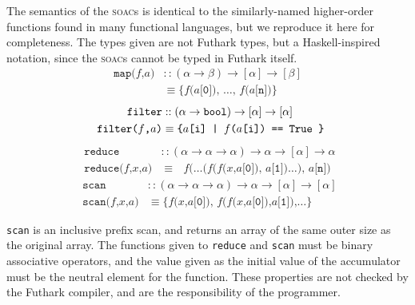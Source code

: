\documentclass[oneside]{memoir}
\begin{document}
The semantics of the \textsc{soac}s is identical to the similarly-named
higher-order functions found in many functional languages, but we
reproduce it here for completeness.  The types given are not Futhark
types, but a Haskell-inspired notation, since the \textsc{soac}s cannot
be typed in Futhark itself.
\begin{align*}
\texttt{map($f$,$a$)}
& :: (\alpha\rightarrow\beta)\rightarrow[\alpha]\rightarrow[\beta] \\
& \equiv \texttt{\{$f$($a$[0]), \ldots, $f$($a$[n])\}}
\end{align*}
\begin{align*}
\texttt{ filter}
& :: (\alpha\rightarrow\texttt{bool})\rightarrow[\alpha]\rightarrow[\alpha] \\
\texttt{ filter($f$,$a$)} & \equiv \texttt{\{$a$[i] | $f$($a$[i]) == \texttt{True }\}}
\end{align*}
\begin{align*}
\texttt{ reduce}
& :: (\alpha\rightarrow\alpha\rightarrow\alpha)\rightarrow\alpha\rightarrow[\alpha]\rightarrow\alpha \\
\texttt{ reduce($f$,$x$,$a$)} & \equiv \texttt{ $f$(\ldots($f$($f$($x$,$a$[0]), $a$[1])\ldots), $a$[n])}
\end{align*}
\begin{align*}
\texttt{ scan}
& :: (\alpha\rightarrow\alpha\rightarrow\alpha)\rightarrow\alpha\rightarrow[\alpha]\rightarrow[\alpha] \\
\texttt{ scan($f$,$x$,$a$)} & \equiv \texttt{\{$f$($x$,$a$[0]), $f$($f$($x$,$a$[0]),$a$[1]),\ldots\}}
\end{align*}

\texttt{scan} is an inclusive prefix scan, and returns an array of the
same outer size as the original array.  The functions given to
\texttt{reduce} and \texttt{scan} must be binary associative
operators, and the value given as the initial value of the accumulator
must be the neutral element for the function.  These properties are
not checked by the Futhark compiler, and are the responsibility of the
programmer.
\end{document}
